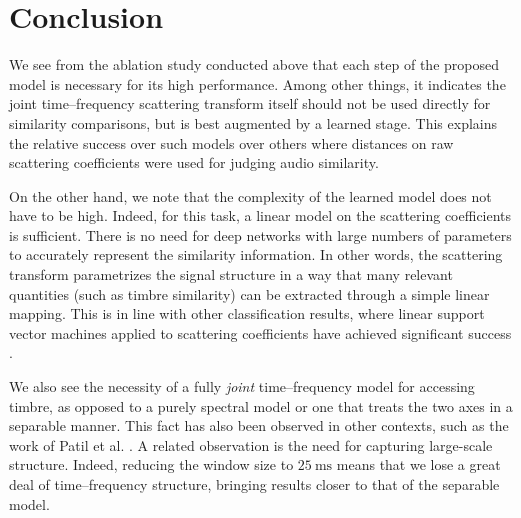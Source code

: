 \documentclass{bmcart}
\newcommand{\nmu}{}
\begin{document}



\section*{\nmu Conclusion}
\label{sec:conclusion}

We see from the ablation study conducted above that each step of the proposed model is necessary for its high performance.
Among other things, it indicates the joint time--frequency scattering transform itself should not be used directly for similarity comparisons, but is best augmented by a learned stage.
This explains the relative success over such models \cite{lostanlen2018jasmp,lostanlen2018extended} over others where distances on raw scattering coefficients were used for judging audio similarity.

On the other hand, we note that the complexity of the learned model does not have to be high.
Indeed, for this task, a linear model on the scattering coefficients is sufficient.
There is no need for deep networks with large numbers of parameters to accurately represent the similarity information.
In other words, the scattering transform parametrizes the signal structure in a way that many relevant quantities (such as timbre similarity) can be extracted through a simple linear mapping.
This is in line with other classification results, where linear support vector machines applied to scattering coefficients have achieved significant success \cite{anden2015mlsp,anden2019tsp}.

We also see the necessity of a fully \emph{joint} time--frequency model for accessing timbre, as opposed to a purely spectral model or one that treats the two axes in a separable manner.
This fact has also been observed in other contexts, such as the work of Patil et al. \cite{patil2012ploscompbiol}.
A related observation is the need for capturing large-scale structure.
Indeed, reducing the window size to $25~\mathrm{ms}$ means that we lose a great deal of time--frequency structure, bringing results closer to that of the separable model.
\end{document}
